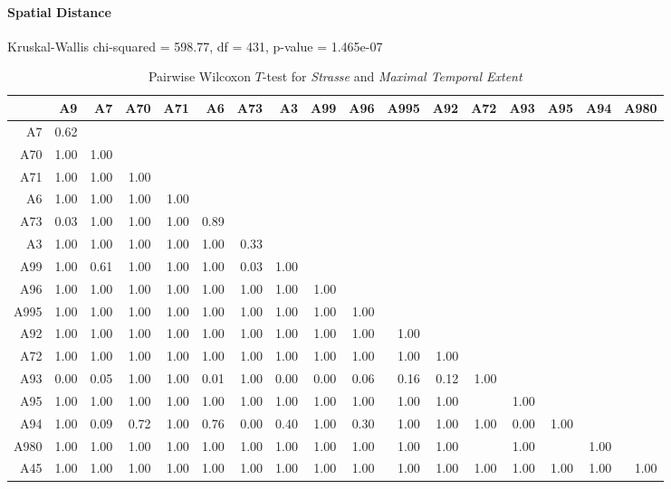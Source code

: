 \paragraph{Spatial Distance}
Kruskal-Wallis chi-squared = 598.77, df = 431, p-value = 1.465e-07

\begin{table}[ht!]
	\tiny
	\setlength{\tabcolsep}{4pt}
	\centering
  \begin{tabular}{rrrrrrrrrrrrrrrrr}
    \hline
         & A9 & A7 & A70 & A71 & A6 & A73 & A3 & A99 & A96 & A995 & A92 & A72 & A93 & A95 & A94 & A980 \\ 
    \hline
    A7   & 0.62 &  &  &  &  &  &  &  &  &  &  &  &  &  &  &  \\ 
    A70  & 1.00 & 1.00 &  &  &  &  &  &  &  &  &  &  &  &  &  &  \\ 
    A71  & 1.00 & 1.00 & 1.00 &  &  &  &  &  &  &  &  &  &  &  &  &  \\ 
    A6   & 1.00 & 1.00 & 1.00 & 1.00 &  &  &  &  &  &  &  &  &  &  &  &  \\ 
    A73  & 0.03 & 1.00 & 1.00 & 1.00 & 0.89 &  &  &  &  &  &  &  &  &  &  &  \\ 
    A3   & 1.00 & 1.00 & 1.00 & 1.00 & 1.00 & 0.33 &  &  &  &  &  &  &  &  &  &  \\ 
    A99  & 1.00 & 0.61 & 1.00 & 1.00 & 1.00 & 0.03 & 1.00 &  &  &  &  &  &  &  &  &  \\ 
    A96  & 1.00 & 1.00 & 1.00 & 1.00 & 1.00 & 1.00 & 1.00 & 1.00 &  &  &  &  &  &  &  &  \\ 
    A995 & 1.00 & 1.00 & 1.00 & 1.00 & 1.00 & 1.00 & 1.00 & 1.00 & 1.00 &  &  &  &  &  &  &  \\ 
    A92  & 1.00 & 1.00 & 1.00 & 1.00 & 1.00 & 1.00 & 1.00 & 1.00 & 1.00 & 1.00 &  &  &  &  &  &  \\ 
    A72  & 1.00 & 1.00 & 1.00 & 1.00 & 1.00 & 1.00 & 1.00 & 1.00 & 1.00 & 1.00 & 1.00 &  &  &  &  &  \\ 
    A93  & 0.00 & 0.05 & 1.00 & 1.00 & 0.01 & 1.00 & 0.00 & 0.00 & 0.06 & 0.16 & 0.12 & 1.00 &  &  &  &  \\ 
    A95  & 1.00 & 1.00 & 1.00 & 1.00 & 1.00 & 1.00 & 1.00 & 1.00 & 1.00 & 1.00 & 1.00 &  & 1.00 &  &  &  \\ 
    A94  & 1.00 & 0.09 & 0.72 & 1.00 & 0.76 & 0.00 & 0.40 & 1.00 & 0.30 & 1.00 & 1.00 & 1.00 & 0.00 & 1.00 &  &  \\ 
    A980 & 1.00 & 1.00 & 1.00 & 1.00 & 1.00 & 1.00 & 1.00 & 1.00 & 1.00 & 1.00 & 1.00 &  & 1.00 &  & 1.00 &  \\ 
    A45  & 1.00 & 1.00 & 1.00 & 1.00 & 1.00 & 1.00 & 1.00 & 1.00 & 1.00 & 1.00 & 1.00 & 1.00 & 1.00 & 1.00 & 1.00 & 1.00 \\ 
    \hline
  \end{tabular}
	\caption{Pairwise Wilcoxon $T$-test for \textit{Strasse} and \textit{Maximal Temporal Extent}}
	\label{tbl:wilcoxon_baysis_matched_Strasse_TMax}
\end{table}
